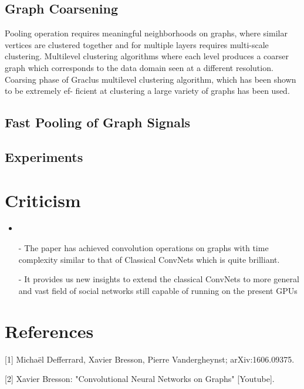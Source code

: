 \documentclass{article}
\begin{document}
\subsection{Graph Coarsening}
Pooling operation requires meaningful neighborhoods on graphs, where similar vertices are
clustered together and for multiple layers requires multi-scale clustering.
Multilevel clustering algorithms where each level produces a coarser graph which corresponds to the data domain seen at a different resolution.
Coarsing phase of Graclus multilevel clustering algorithm, which has been shown to be extremely ef-
ficient at clustering a large variety of graphs has been used.

\subsection{Fast Pooling of Graph Signals}

\subsection{Experiments} 


\section{Criticism}
  \begin{itemize}
    \item 
    \item[-]  The paper has achieved convolution operations on graphs with time complexity similar to that of Classical ConvNets which is quite brilliant.
    \item[-]  It provides us new insights to extend the classical ConvNets to more general and vast field of social networks still capable of running
    on the present GPUs   

   
  \end{itemize} 



\section*{References}

\small

[1] Michaël Defferrard, Xavier Bresson, Pierre Vandergheynst; arXiv:1606.09375.

[2] Xavier Bresson: "Convolutional Neural Networks on Graphs" [Youtube].
\end{document}
